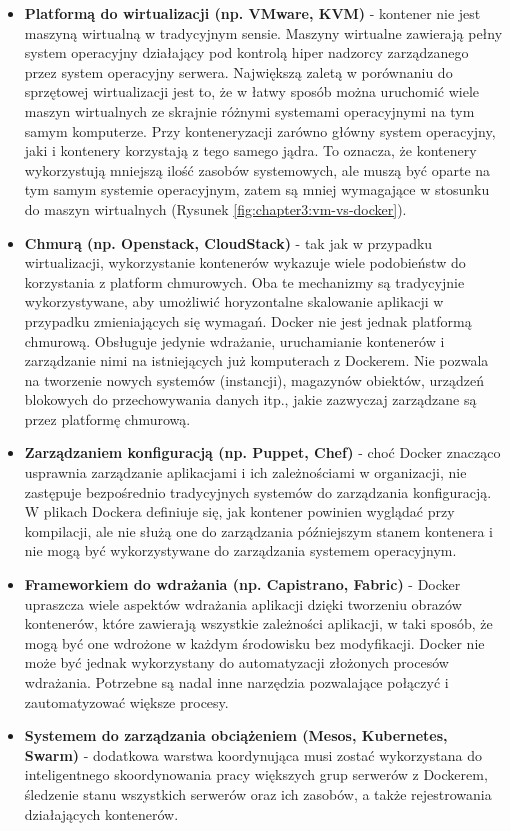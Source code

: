 \begin{itemize}
    \item \textbf{Platformą do wirtualizacji (np. VMware, KVM)} - kontener nie jest maszyną wirtualną w tradycyjnym sensie. Maszyny wirtualne zawierają pełny system operacyjny działający pod kontrolą hiper nadzorcy zarządzanego przez system operacyjny serwera. Największą zaletą w porównaniu do sprzętowej wirtualizacji jest to, że w łatwy sposób można uruchomić wiele maszyn wirtualnych ze skrajnie różnymi systemami operacyjnymi na tym samym komputerze. Przy konteneryzacji zarówno główny system operacyjny, jaki i kontenery korzystają z tego samego jądra. To oznacza, że kontenery wykorzystują mniejszą ilość zasobów systemowych, ale muszą być oparte na tym samym systemie operacyjnym, zatem są mniej wymagające w stosunku do maszyn wirtualnych (Rysunek \ref{fig:chapter3:vm-vs-docker}).
    \item \textbf{Chmurą (np. Openstack, CloudStack)} - tak jak w przypadku wirtualizacji, wykorzystanie kontenerów wykazuje wiele podobieństw do korzystania z platform chmurowych. Oba te mechanizmy są tradycyjnie wykorzystywane, aby umożliwić horyzontalne skalowanie aplikacji w przypadku zmieniających się wymagań. Docker nie jest jednak platformą chmurową. Obsługuje jedynie wdrażanie, uruchamianie kontenerów i zarządzanie nimi na istniejących już komputerach z Dockerem. Nie pozwala na tworzenie nowych systemów (instancji), magazynów obiektów, urządzeń blokowych do przechowywania danych itp., jakie zazwyczaj zarządzane są przez platformę chmurową.
    \item \textbf{Zarządzaniem konfiguracją (np. Puppet, Chef) } - choć Docker znacząco usprawnia zarządzanie aplikacjami i ich zależnościami w organizacji, nie zastępuje bezpośrednio tradycyjnych systemów do zarządzania konfiguracją. W plikach Dockera definiuje się, jak kontener powinien wyglądać przy kompilacji, ale nie służą one do zarządzania późniejszym stanem kontenera i nie mogą być wykorzystywane do zarządzania systemem operacyjnym.
    \item \textbf{Frameworkiem do wdrażania (np. Capistrano, Fabric)} - Docker upraszcza wiele aspektów wdrażania aplikacji dzięki tworzeniu obrazów kontenerów, które zawierają wszystkie zależności aplikacji, w taki sposób, że mogą być one wdrożone w każdym środowisku bez modyfikacji. Docker nie może być jednak wykorzystany do automatyzacji złożonych procesów wdrażania. Potrzebne są nadal inne narzędzia pozwalające połączyć i zautomatyzować większe procesy.
    \item \textbf{Systemem do zarządzania obciążeniem (Mesos, Kubernetes, Swarm)} - dodatkowa warstwa koordynująca musi zostać wykorzystana do inteligentnego skoordynowania pracy większych grup serwerów z Dockerem, śledzenie stanu wszystkich serwerów oraz ich zasobów, a także rejestrowania działających kontenerów.
\end{itemize}

